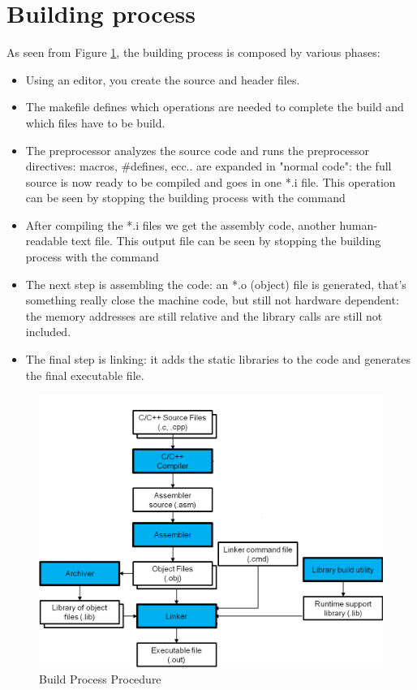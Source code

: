 \section{Building process}
As seen from Figure \ref{Fig:Build_process}, the building process is composed by various phases:
\begin{itemize}
	\item Using an editor, you create the source and header files.
	\item The makefile defines which operations are needed to complete the build and which files have to be build.
	\item The preprocessor analyzes the source code and runs the preprocessor directives: macros, \#defines, ecc.. are expanded in "normal code": the full source is now ready to be compiled and goes in one *.i file. This operation can be seen by stopping the building process with the command 
	\item After compiling the *.i files we get the assembly code, another human-readable text file. This output file can be seen by stopping the building process with the command 
	\item The next step is assembling the code: an *.o (object) file is generated, that's something really close the machine code, but still not hardware dependent: the memory addresses are still relative and the library calls are still not included.
	\item The final step is linking: it adds the static libraries to the code and generates the final executable file.
\end{itemize}
\begin{figure}[h]
	\centering
	\includegraphics[width=\textwidth]{gfx/build_process}
	
	\caption{Build Process Procedure}
	\label{Fig:Build_process}
\end{figure}

